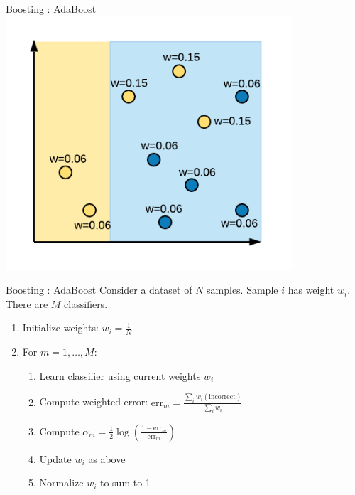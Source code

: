 \documentclass[aspectratio=169,10pt]{beamer}
\newcommand{\fitpic}[1]{\begin{adjustbox}{max width=\linewidth, max totalheight=0.78\textheight}#1\end{adjustbox}}
\begin{document}
\begin{frame}{Boosting : AdaBoost }
  \centering
  \fitpic{\includegraphics[width=0.8\textwidth]{../assets/ensemble/diagrams/ada_iter1_new_weights}}
\end{frame}

\begin{frame}{Boosting : AdaBoost }
  Consider a dataset of $N$ samples. Sample $i$ has weight $w_i$. There are $M$ classifiers.\\[0.3cm]
  \begin{enumerate}
    \item Initialize weights: $w_i = \frac{1}{N}$
    \item For $m = 1, \ldots, M$:
          \begin{enumerate}
            \item Learn classifier using current weights $w_i$
            \item Compute weighted error: $\text{err}_m = \frac{\sum_i w_i(\text{incorrect})}{\sum_i w_i}$
            \item Compute $\alpha_m = \tfrac{1}{2}\log\!\left(\frac{1 - \text{err}_m}{\text{err}_m}\right)$
            \item Update $w_i$ as above
            \item Normalize $w_i$ to sum to 1
          \end{enumerate}
  \end{enumerate}
\end{frame}
\end{document}

